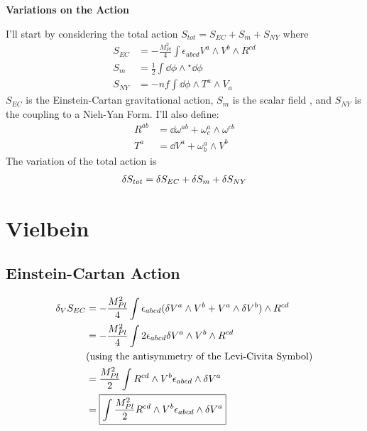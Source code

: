 \documentclass[12pt]{article}
\newcommand{\hodge}{{^\star}}
\begin{document}
\begin{center}
  \Large\textbf{Variations on the Action} \\
  \large{}
\end{center}

I'll start by considering the total action $S_{tot} = S_{EC} + S_m + S_{NY}$ where
\begin{align}
  S_{EC} &= -\frac{M_{Pl}^2}{4}\int\epsilon_{abcd}V^a \wedge V^b \wedge R^{cd} \\
  S_m &= \frac{1}{2}\int\dd\phi\wedge\hodge\dd\phi \\
  S_{NY} &= -\mathit{nf}\int\dd\phi\wedge T^a \wedge V_a
\end{align}
$S_{EC}$ is the Einstein-Cartan gravitational action, $S_m$ is the scalar field , and $S_{NY}$ is the coupling to a Nieh-Yan Form. I'll also define:
\begin{align*}
  R^{ab} &= \dd\omega^{ab} + \omega^a_c \wedge \omega^{cb} \\
  T^a &= \dd V^a + \omega^a_b \wedge V^b
\end{align*}
The variation of the total action is
\begin{align}
  \var{S_{tot}} = \var{S_{EC}} + \var{S_m} + \var{S_{NY}}
\end{align}

\section{Vielbein}
\subsection{Einstein-Cartan Action}
\begin{align}
  \var_V{S_{EC}} &= -\frac{M_{Pl}^2}{4}\int \epsilon_{abcd}(\var V^a \wedge V^b + V^a \wedge \var V^b) \wedge R^{cd} \nonumber \\
  &= -\frac{M_{Pl}^2}{4}\int 2\epsilon_{abcd}\var V^a \wedge V^b \wedge R^{cd} \nonumber \\ &\text{(using the antisymmetry of the Levi-Civita Symbol)} \nonumber\\
  &= \frac{M_{Pl}^2}{2}\int R^{cd} \wedge V^b \epsilon_{abcd} \wedge \var V^a \nonumber \\
  &= \boxed{\int \frac{M_{Pl}^2}{2} R^{cd} \wedge V^b \epsilon_{abcd} \wedge \var V^a}
\end{align}
\end{document}

